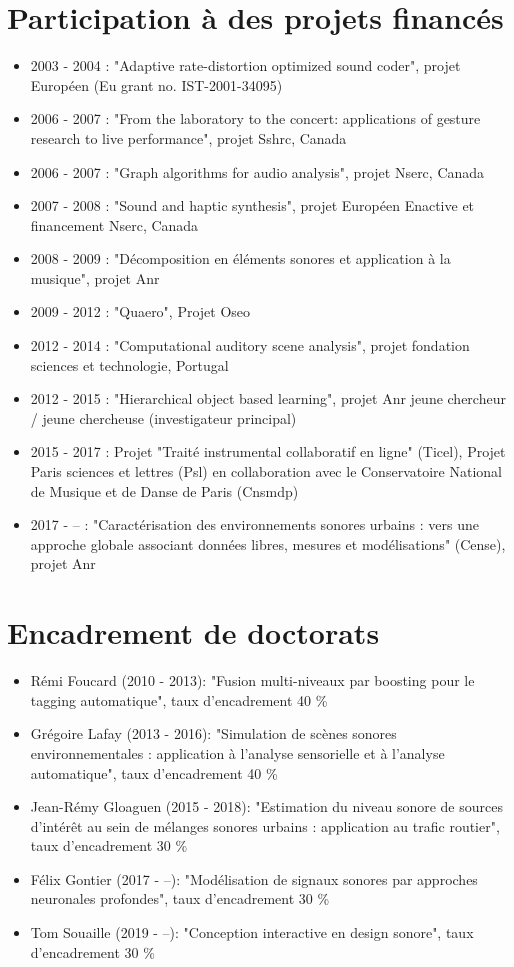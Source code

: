 \section{Participation à des projets financés}
\begin{itemize}
\item 2003 - 2004 : "Adaptive rate-distortion optimized sound coder", projet Européen (Eu grant no. IST-2001-34095)
\item 2006 - 2007 : "From the laboratory to the concert: applications of gesture research to live performance", projet Sshrc, Canada
\item 2006 - 2007 : "Graph algorithms for audio analysis", projet Nserc, Canada
\item 2007 - 2008 : "Sound and haptic synthesis", projet Européen Enactive et financement Nserc, Canada
\item 2008 - 2009 : "Décomposition en éléments sonores et application à la musique", projet Anr
\item 2009 - 2012 : "Quaero", Projet Oseo
\item 2012 - 2014 : "Computational auditory scene analysis", projet fondation sciences et technologie, Portugal
\item 2012 - 2015 : "Hierarchical object based learning", projet Anr jeune chercheur / jeune chercheuse (investigateur principal)
\item 2015 - 2017 : Projet "Traité instrumental collaboratif en ligne" (Ticel), Projet Paris sciences et lettres (Psl) en collaboration avec le Conservatoire National de Musique et de Danse de Paris (Cnsmdp)
\item 2017 - -- : "Caractérisation des environnements sonores urbains : vers une approche globale associant données libres, mesures et modélisations" (Cense), projet Anr
\end{itemize}

\section{Encadrement de doctorats}
\begin{itemize}
  \item Rémi Foucard (2010 - 2013): "Fusion multi-niveaux par boosting pour le tagging automatique", taux d'encadrement 40 \%
  \item Grégoire Lafay (2013 - 2016): "Simulation de scènes sonores environnementales : application à l'analyse sensorielle et à l'analyse automatique", taux d'encadrement 40 \%
  \item Jean-Rémy Gloaguen (2015 - 2018): "Estimation du niveau sonore de sources d'intérêt au sein de mélanges sonores urbains : application au trafic routier", taux d'encadrement 30 \%
  \item Félix Gontier (2017 - --): "Modélisation de signaux sonores par approches neuronales profondes", taux d'encadrement 30 \%
  \item Tom Souaille (2019 - --): "Conception interactive en design sonore", taux d'encadrement 30 \%
\end{itemize}

